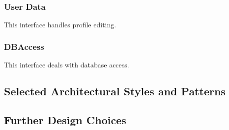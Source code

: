 		\subsubsection{User Data}
			This interface handles profile editing.
		\subsubsection{DBAccess}		
			This interface deals with database access.
			
\subsection{Selected Architectural Styles and Patterns}

\subsection{Further Design Choices}

